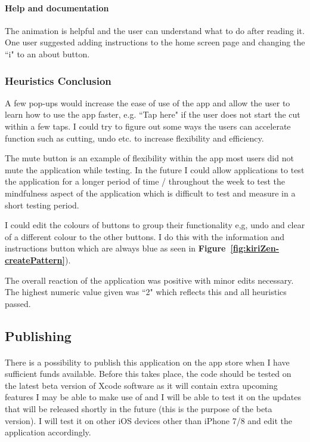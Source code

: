 \documentclass[11pt]{article}
\begin{document}
                \paragraph{Help and documentation} 
                The animation is helpful and the user can understand what to do after reading it. One user suggested adding instructions to the home screen page and changing the ``i" to an about button.
                
                \subsubsection{Heuristics Conclusion}
                A few pop-ups would increase the ease of use of the app and allow the user to learn how to use the app faster, e.g. ``Tap here" if the user does not start the cut within a few taps. I could try to figure out some ways the users can accelerate function such as cutting, undo etc. to increase flexibility and efficiency. 
                
                The mute button is an example of flexibility within the app most users did not mute the application while testing. In the future I could allow applications to test the application for a longer period of time / throughout the week to test the mindfulness aspect of the application which is difficult to test and measure in a short testing period. 
                
                 I could edit the colours of buttons to group their functionality e,g, undo and clear of a different colour to the other buttons. I do this with the information and instructions button which are always blue as seen in \textbf{Figure~\ref{fig:kiriZen-createPattern}}).
                
                The overall reaction of the application was positive with minor edits necessary. The highest numeric value given was ``2" which reflects this and all heuristics passed. 
                
        

    \subsection{Publishing}
        \paragraph{}
        There is a possibility to publish this application on the app store when I have sufficient funds available. Before this takes place, the code should be tested on the latest beta version of Xcode software as it will contain extra upcoming features I may be able to make use of and I will be able to test it on the updates that will be released shortly in the future (this is the purpose of the beta version). I will test it on other iOS devices other than iPhone 7/8 and edit the application accordingly.
        
\end{document}
